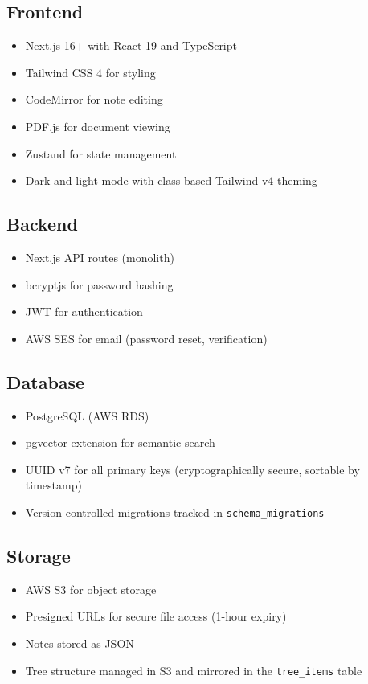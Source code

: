 \documentclass[12pt,a4paper]{article}
\begin{document}
\subsection{Frontend}

\begin{itemize}
    \item Next.js 16+ with React 19 and TypeScript
    \item Tailwind CSS 4 for styling
    \item CodeMirror for note editing
    \item PDF.js for document viewing
    \item Zustand for state management
    \item Dark and light mode with class-based Tailwind v4 theming
\end{itemize}

\subsection{Backend}

\begin{itemize}
    \item Next.js API routes (monolith)
    \item bcryptjs for password hashing
    \item JWT for authentication
    \item AWS SES for email (password reset, verification)
\end{itemize}

\subsection{Database}

\begin{itemize}
    \item PostgreSQL (AWS RDS)
    \item pgvector extension for semantic search
    \item UUID v7 for all primary keys (cryptographically secure, sortable by timestamp)
    \item Version-controlled migrations tracked in \texttt{schema\_migrations}
\end{itemize}

\subsection{Storage}

\begin{itemize}
    \item AWS S3 for object storage
    \item Presigned URLs for secure file access (1-hour expiry)
    \item Notes stored as JSON
    \item Tree structure managed in S3 and mirrored in the \texttt{tree\_items} table
\end{itemize}
\end{document}
